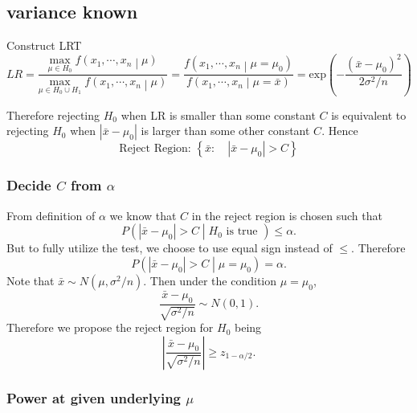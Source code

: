 \documentclass[a4paper,12pt]{article}
\begin{document}
\subsection{variance known}
\label{sec:variance-known}

Construct LRT
\[
  LR = \frac{
    \underset{\mu\in H_0}{\mathrm{max}}\;
    f\left(x_1, \cdots, x_n\middle|\mu\right)
  }{
    \underset{\mu\in H_0\cup H_1}{\mathrm{max}}\;
    f\left(x_1, \cdots, x_n\middle|\mu\right)
  }
  =\frac{
    f\left(x_1, \cdots, x_n\middle|\mu = \mu_0\right)
  }{
    f\left(x_1, \cdots, x_n\middle|\mu = \bar{x}\right)
  }
  = \mathrm{exp}\left(
    -\frac{\left(\bar{x} - \mu_0\right)^2}{2\sigma^2 / n}
  \right)
\]

Therefore rejecting $H_0$ when LR is smaller than some constant $C$ is equivalent to rejecting $H_0$ when $\left|\bar{x} - \mu_0\right|$ is larger than some other constant $C$. Hence
\[
  \text{Reject Region: }
  \left\{
    \bar{x}
    :\quad
    \left|\bar{x}-\mu_0\right| > C
  \right\}
\]

\subsubsection{Decide $C$ from $\alpha$}
\label{sec:decide-c-from}

From definition of $\alpha$ we know that $C$ in the reject region is chosen such that
\[
  P\left(
    \left|\bar{x} - \mu_0\right| > C
    \middle| H_0\text{ is true }\right)
  \leq \alpha
  .
\]
But to fully utilize the test, we choose to use equal sign instead of $\leq$. Therefore
\[
  P\left(
    \left|\bar{x} - \mu_0\right| > C
    \middle| \mu = \mu_0
  \right)
  = \alpha
  .
\]
Note that $\bar{x}\sim N\left(\mu, \sigma^2 / n\right)$. Then under the condition $\mu = \mu_0$,
\[
  \frac{\bar{x} - \mu_0}{\sqrt{\sigma^2 / n}}
  \sim N\left(0, 1\right)
  .
\]
Therefore we propose the reject region for $H_0$ being
\[
  \left|
    \frac{\bar{x} - \mu_0}{\sqrt{\sigma^2 / n}}
  \right|
  \geq z_{1 - \alpha / 2}
  .
\]

\subsubsection{Power at given underlying $\mu$}
\label{sec:power-at-given}
\end{document}
